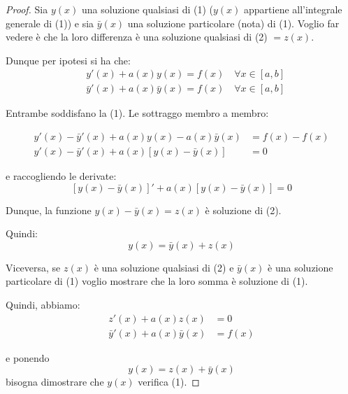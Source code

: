 \begin{proof}
    Sia \(y(x)\) una soluzione qualsiasi di (1) (\(y(x)\) appartiene all'integrale generale di (1))
    e sia \(\bar y(x)\) una soluzione particolare (nota) di (1). Voglio far vedere è che la loro differenza è una soluzione qualsiasi di (2) \(= z(x)\).

    Dunque per ipotesi si ha che:
    \begin{align*}
         & y'(x)+a(x)y(x) = f(x) \quad \forall x \in [a,b]              \\
         & \bar y'(x) + a(x) \bar y(x) = f(x) \quad \forall x \in [a,b]
    \end{align*}

    Entrambe soddisfano la (1). Le sottraggo membro a membro:

    \begin{align*}
        y'(x)-\bar y'(x) + a(x)y(x) - a(x) \bar y(x)         & = f(x) - f(x) \\
        y'(x)-\bar y'(x) + a(x)\left[y(x) - \bar y(x)\right] & = 0
    \end{align*}

    e raccogliendo le derivate:
    \[
        [y(x)-\bar y(x)]' + a(x)[y(x) - \bar y(x)] = 0
    \]

    Dunque, la funzione \(y(x) - \bar y(x) = z(x)\) è soluzione di (2).

    Quindi:
    \[
        y(x) = \bar y(x) + z(x)
    \]

    Viceversa, se \(z(x)\) è una soluzione qualsiasi di (2) e \(\bar y(x)\) è una soluzione particolare di (1)
    voglio mostrare che la loro somma è soluzione di (1).

    Quindi, abbiamo:
    \begin{align*}
        z'(x) + a(x)z(x)            & = 0    \\
        \bar y'(x) + a(x) \bar y(x) & = f(x)
    \end{align*}

    e ponendo
    \[
        y(x) = z(x) + \bar y(x)
    \]
    bisogna dimostrare che \(y(x)\) verifica (1).


\end{proof}
